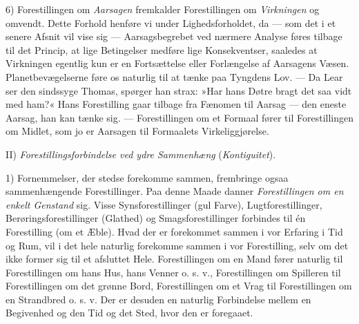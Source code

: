 \documentclass[12pt,a4paper,openany]{book}
\begin{document}
6) Forestillingen om \emph{Aarsagen} fremkalder Forestillingen om
\emph{Virkningen} og omvendt. Dette Forhold henføre vi under
Lighedsforholdet, da --- som det i et senere Afsnit vil vise sig ---
Aarsagsbegrebet ved nærmere Analyse føres tilbage til det Princip, at
lige Betingelser medføre lige Konsekventser, saaledes at Virkningen
egentlig kun er en Fortsættelse eller Forlængelse af Aarsagens Væsen.
Planetbevægelserne føre os naturlig til at tænke paa Tyngdens Lov. ---
Da Lear ser den sindssyge Thomas, spørger han strax: »Har hans Døtre
bragt det saa vidt med ham?« Hans Forestilling gaar tilbage fra Fænomen
til Aarsag --- den eneste Aarsag, han kan tænke sig. --- Forestillingen
om et Formaal fører til Forestillingen om Midlet, som jo er Aarsagen til
Formaalets Virkeliggjørelse.

II) \emph{Forestillingsforbindelse ved ydre Sammenhæng}
(\emph{Kontiguitet}).

1) Fornemmelser, der stedse forekomme sammen, frembringe ogsaa
sammenhængende Forestillinger. Paa denne Maade danner
\emph{Forestillingen om en enkelt Genstand} sig. Visse
Synsforestillinger (gul Farve), Lugtforestillinger,
Berøringsforestillinger (Glathed) og Smagsforestillinger forbindes til
én Forestilling (om et Æble). Hvad der er forekommet sammen i vor
Erfaring i Tid og Rum, vil i det hele naturlig forekomme sammen i vor
Forestilling, selv om det ikke former sig til et afsluttet Hele.
Forestillingen om en Mand fører naturlig til Forestillingen om hans Hus,
hans Venner o. s. v., Forestillingen om Spilleren til Forestillingen om
det grønne Bord, Forestillingen om et Vrag til Forestillingen om en
Strandbred o. s. v. Der er desuden en naturlig Forbindelse mellem en
Begivenhed og den Tid og det Sted, hvor den er foregaaet.
\end{document}
